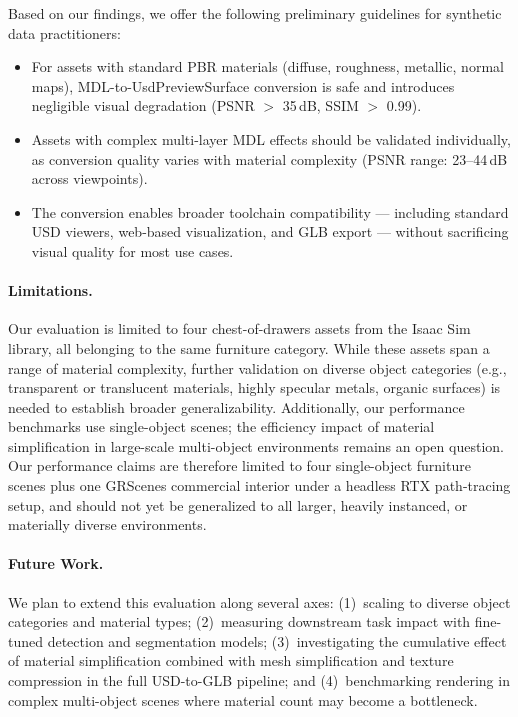 Based on our findings, we offer the following preliminary guidelines for
synthetic data practitioners:
\begin{itemize}
    \item For assets with standard PBR materials (diffuse, roughness, metallic,
    normal maps), MDL-to-UsdPreviewSurface conversion is safe and introduces
    negligible visual degradation (PSNR $>$ 35\,dB, SSIM $>$ 0.99).
    \item Assets with complex multi-layer MDL effects should be validated
    individually, as conversion quality varies with material complexity (PSNR
    range: 23--44\,dB across viewpoints).
    \item The conversion enables broader toolchain compatibility --- including
    standard USD viewers, web-based visualization, and GLB export --- without
    sacrificing visual quality for most use cases.
\end{itemize}

\paragraph{Limitations.}
Our evaluation is limited to four chest-of-drawers assets from the Isaac Sim
library, all belonging to the same furniture category. While these assets span
a range of material complexity, further validation on diverse object categories
(e.g., transparent or translucent materials, highly specular metals, organic
surfaces) is needed to establish broader generalizability. Additionally, our
performance benchmarks use single-object scenes; the efficiency impact of
material simplification in large-scale multi-object environments remains an
open question. Our performance claims are therefore limited to four
single-object furniture scenes plus one GRScenes commercial interior under a
headless RTX path-tracing setup, and should not yet be generalized to all
larger, heavily instanced, or materially diverse environments.

\paragraph{Future Work.}
We plan to extend this evaluation along several axes: (1)~scaling to diverse
object categories and material types; (2)~measuring downstream task impact
with fine-tuned detection and segmentation models; (3)~investigating the
cumulative effect of material simplification combined with mesh simplification
and texture compression in the full USD-to-GLB pipeline; and
(4)~benchmarking rendering in complex multi-object scenes where material count
may become a bottleneck.
